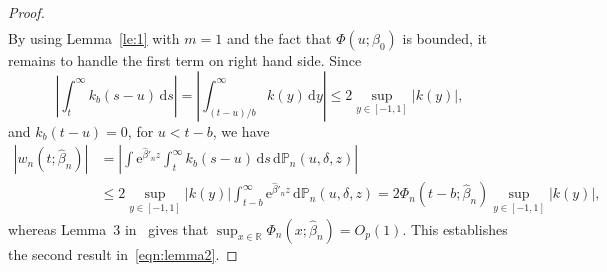 \documentclass[11pt,reqno]{amsart}
\theoremstyle{definition}
\theoremstyle{plain}
\theoremstyle{remark}
\begin{document}
\begin{proof}
\[\begin{split}
\end{split}
\]
By using Lemma~\ref{le:1} with $m=1$ and the fact that $\Phi(u;\beta_0)$ is bounded, it remains to
handle the first term on right hand side.
Since
\begin{equation}
\label{eq:bound int kb}
\left|
\int_{t}^{\infty}k_b(s-u)\,\mathrm{d}s
\right|
=
\left|
\int_{(t-u)/b}^{\infty}k(y)\,\mathrm{d}y
\right|
\leq
2\sup_{y\in[-1,1]}|k(y)|,
\end{equation}
and $k_b(t-u)=0$, for $u<t-b$,
we have
\[
\begin{split}
|w_n(t;\hat\beta_n)|
&=
\left|
\int
\mathrm{e}^{\hat{\beta}'_nz}
\int_{t}^{\infty}k_b(s-u)\,\mathrm{d}s
\,\mathrm{d}{\mathbb{P}}_n(u,\delta,z)
\right|
\\
&\leq
2\sup_{y\in[-1,1]}|k(y)|
\int_{t-b}^{\infty}\mathrm{e}^{\hat{\beta}'_nz}\,\mathrm{d}{\mathbb{P}}_n(u,\delta,z)
=
2\Phi_n(t-b;\hat{\beta}_n)
\sup_{y\in[-1,1]}|k(y)|,
\end{split}
\]
whereas Lemma~3 in~\cite{LopuhaaNane2013} gives that $\sup_{x\in{\mathbb{R}}}\Phi_n(x;\hat{\beta}_n)=O_p(1)$.
This establishes the second result in~\eqref{eqn:lemma2}.
\end{proof}
\end{document}
